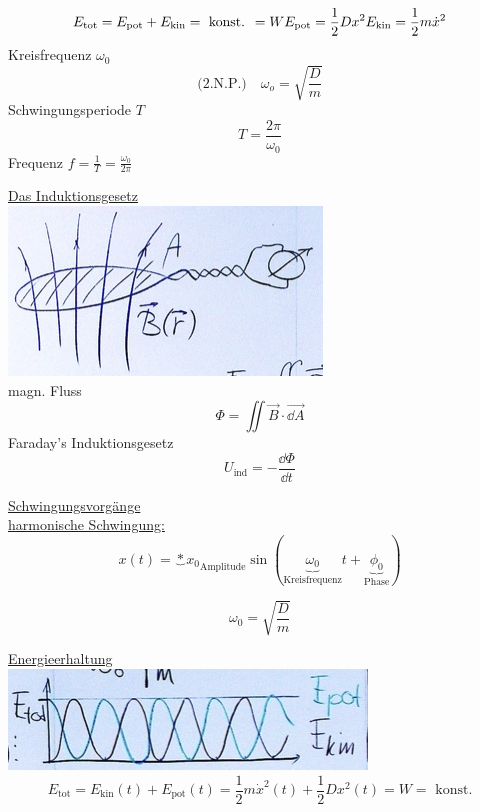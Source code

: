 \[
	E_{\text{tot}} = E_{\text{pot}} + E_{\text{kin}} = \text{ konst. } = W \\
	E_{\text{pot}} = \frac{1}{2} D x^2 \\
	E_{\text{kin}} = \frac{1}{2} m \dot{x}^2
\]
Kreisfrequenz $\omega_0$
\[ \text{(2.N.P.)} \quad \omega_o = \sqrt{\frac{D}{m}} \]
Schwingungsperiode $T$
\[ \boxed{ T = \frac{2\pi}{\omega_0} } \]
Frequenz $f = \frac{1}{T} = \frac{\omega_0}{2\pi}$

\begin{rep*}
	\uline{Das Induktionsgesetz} \\
	\includegraphics{Bild214} \\
	magn. Fluss
	\[ \Phi = \iint \vec{B} \cdot \vec{\dd A} \]
	Faraday's Induktionsgesetz
	\[ \boxed{ U_{\text{ind}} = -\frac{\dd \Phi}{\dd t} } \]
	
	\uline{Schwingungsvorgänge} \\
	\uline{harmonische Schwingung:}
	\[ \boxed{ x(t) = \underbrace*{x_0}_{\text{Amplitude}} \sin( \underbrace{\omega_0}_{\text{Kreisfrequenz}} t + \underbrace{\phi_0}_{\text{Phase}} ) } \]
	\begin{bsp*}[ note = Federpendel ]
		\[ \omega_0 = \sqrt{\frac{D}{m}} \]
	\end{bsp*}
	\uline{Energieerhaltung}\\
	\includegraphics{Bild215}
	\[ E_{\text{tot}} = E_{\text{kin}}(t) + E_{\text{pot}}(t) = \frac{1}{2} m \dot{x}^2(t) + \frac{1}{2} D x^2(t) = W = \text{ konst.} \]
\end{rep*}

